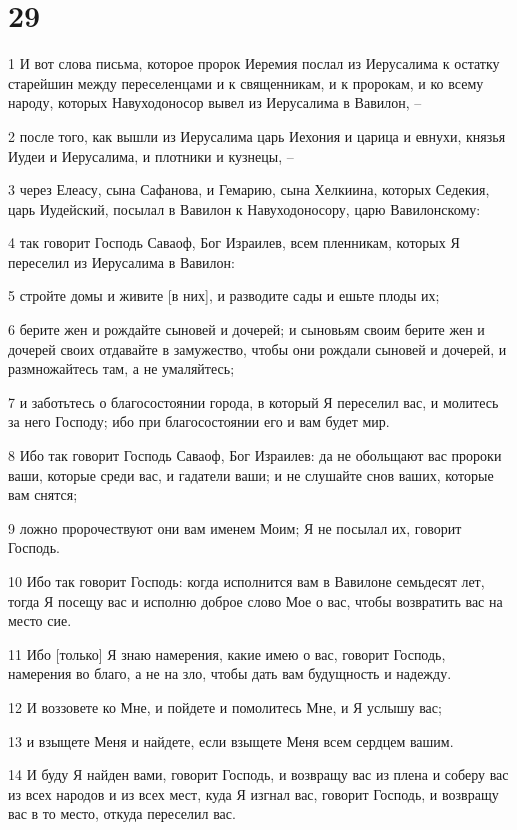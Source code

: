 \chapter{29}

\par 1 И вот слова письма, которое пророк Иеремия послал из Иерусалима к остатку старейшин между переселенцами и к священникам, и к пророкам, и ко всему народу, которых Навуходоносор вывел из Иерусалима в Вавилон, --
\par 2 после того, как вышли из Иерусалима царь Иехония и царица и евнухи, князья Иудеи и Иерусалима, и плотники и кузнецы, --
\par 3 через Елеасу, сына Сафанова, и Гемарию, сына Хелкиина, которых Седекия, царь Иудейский, посылал в Вавилон к Навуходоносору, царю Вавилонскому:
\par 4 так говорит Господь Саваоф, Бог Израилев, всем пленникам, которых Я переселил из Иерусалима в Вавилон:
\par 5 стройте домы и живите [в них], и разводите сады и ешьте плоды их;
\par 6 берите жен и рождайте сыновей и дочерей; и сыновьям своим берите жен и дочерей своих отдавайте в замужество, чтобы они рождали сыновей и дочерей, и размножайтесь там, а не умаляйтесь;
\par 7 и заботьтесь о благосостоянии города, в который Я переселил вас, и молитесь за него Господу; ибо при благосостоянии его и вам будет мир.
\par 8 Ибо так говорит Господь Саваоф, Бог Израилев: да не обольщают вас пророки ваши, которые среди вас, и гадатели ваши; и не слушайте снов ваших, которые вам снятся;
\par 9 ложно пророчествуют они вам именем Моим; Я не посылал их, говорит Господь.
\par 10 Ибо так говорит Господь: когда исполнится вам в Вавилоне семьдесят лет, тогда Я посещу вас и исполню доброе слово Мое о вас, чтобы возвратить вас на место сие.
\par 11 Ибо [только] Я знаю намерения, какие имею о вас, говорит Господь, намерения во благо, а не на зло, чтобы дать вам будущность и надежду.
\par 12 И воззовете ко Мне, и пойдете и помолитесь Мне, и Я услышу вас;
\par 13 и взыщете Меня и найдете, если взыщете Меня всем сердцем вашим.
\par 14 И буду Я найден вами, говорит Господь, и возвращу вас из плена и соберу вас из всех народов и из всех мест, куда Я изгнал вас, говорит Господь, и возвращу вас в то место, откуда переселил вас.
